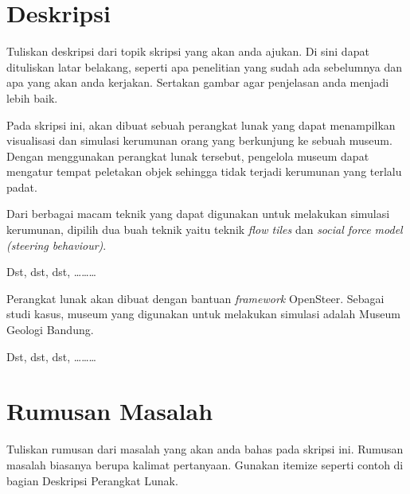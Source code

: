 \documentclass[a4paper,twoside]{article}
\begin{document}
\title{\@judultopik}
\author{\nama \textendash \@npm} 

\newcommand{\nama}{Edwin Pranajaya}
\newcommand{\@npm}{2017730027}
\newcommand{\@judultopik}{Dukungan Bahasa JavaScript pada SharIF Judge} %
\newcommand{\jumpemb}{1} %
\newcommand{\tanggal}{01/01/1900}


\maketitle


\section{Deskripsi}
Tuliskan deskripsi dari topik skripsi yang akan anda ajukan. Di sini dapat dituliskan latar belakang, seperti apa penelitian yang sudah ada sebelumnya dan apa yang akan anda kerjakan. Sertakan gambar agar penjelasan anda menjadi lebih baik.

Pada skripsi ini, akan dibuat sebuah perangkat lunak yang dapat menampilkan visualisasi dan simulasi kerumunan orang yang berkunjung ke sebuah museum. Dengan menggunakan perangkat lunak tersebut, pengelola museum dapat mengatur tempat peletakan objek sehingga tidak terjadi kerumunan yang terlalu padat.

Dari berbagai macam teknik yang dapat digunakan untuk melakukan simulasi kerumunan, dipilih dua buah teknik yaitu teknik {\it flow tiles} dan {\it social force model (steering behaviour)}.

Dst, dst, dst, \ldots\ldots\ldots 

Perangkat lunak akan dibuat dengan bantuan {\it framework} OpenSteer. Sebagai studi kasus, museum yang digunakan untuk melakukan simulasi adalah Museum Geologi Bandung.

Dst, dst, dst, \ldots\ldots\ldots 

\section{Rumusan Masalah}
Tuliskan rumusan dari masalah yang akan anda bahas pada skripsi ini. Rumusan masalah biasanya berupa kalimat pertanyaan. Gunakan itemize seperti contoh di bagian Deskripsi Perangkat Lunak.
\end{document}
